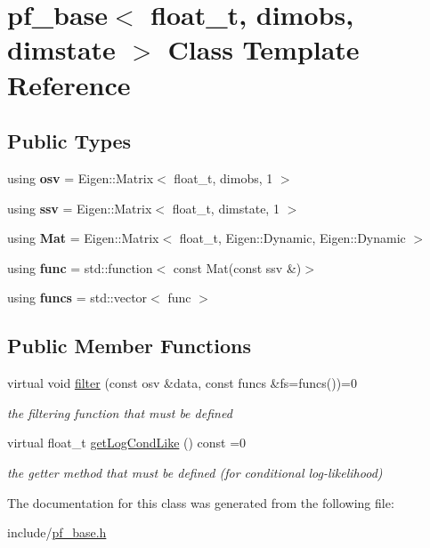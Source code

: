 \hypertarget{classpf__base}{}\section{pf\+\_\+base$<$ float\+\_\+t, dimobs, dimstate $>$ Class Template Reference}
\label{classpf__base}
\subsection*{Public Types}
\begin{DoxyCompactItemize}
\item 
\mbox{\label{classpf__base_ab468bc1a4c41a4ad7372281a1db7db8b}} 
using {\bfseries osv} = Eigen\+::\+Matrix$<$ float\+\_\+t, dimobs, 1 $>$
\item 
\mbox{\label{classpf__base_add01ddbbba6953260f53d47bae2888d2}} 
using {\bfseries ssv} = Eigen\+::\+Matrix$<$ float\+\_\+t, dimstate, 1 $>$
\item 
\mbox{\label{classpf__base_a6b7fbe89aa5e34880ad81a5f48e82a04}} 
using {\bfseries Mat} = Eigen\+::\+Matrix$<$ float\+\_\+t, Eigen\+::\+Dynamic, Eigen\+::\+Dynamic $>$
\item 
\mbox{\label{classpf__base_ae409bcfbd5e1bc542134c4e9b6dce6c3}} 
using {\bfseries func} = std\+::function$<$ const Mat(const ssv \&)$>$
\item 
\mbox{\label{classpf__base_a0c328d66f991393ec0f1a082d5cbf4a6}} 
using {\bfseries funcs} = std\+::vector$<$ func $>$
\end{DoxyCompactItemize}
\subsection*{Public Member Functions}
\begin{DoxyCompactItemize}
\item 
\mbox{\label{classpf__base_aec857789031fd938b7088faa3607707a}} 
virtual void \hyperlink{classpf__base_aec857789031fd938b7088faa3607707a}{filter} (const osv \&data, const funcs \&fs=funcs())=0
\begin{DoxyCompactList}\small\item\em the filtering function that must be defined \end{DoxyCompactList}\item 
\mbox{\label{classpf__base_a350df818820d6ab0fd6d413022b7f23b}} 
virtual float\+\_\+t \hyperlink{classpf__base_a350df818820d6ab0fd6d413022b7f23b}{get\+Log\+Cond\+Like} () const =0
\begin{DoxyCompactList}\small\item\em the getter method that must be defined (for conditional log-\/likelihood) \end{DoxyCompactList}\end{DoxyCompactItemize}


The documentation for this class was generated from the following file\+:\begin{DoxyCompactItemize}
\item 
include/\hyperlink{pf__base_8h}{pf\+\_\+base.\+h}\end{DoxyCompactItemize}

